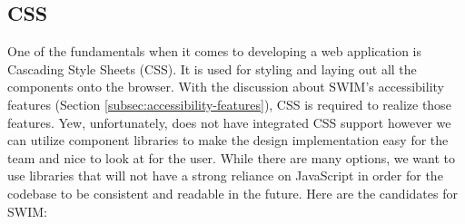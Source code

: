 \documentclass[
    paper=letter,
    parskip=half,
    fontsize=12pt,
    titlepage=firstiscover,
    toc=bibliography,
    numbers=endperiod
]{scrartcl}
\begin{document}
\subsection{CSS}

One of the fundamentals when it comes to developing a web application is
Cascading Style Sheets (CSS). It is used for styling and laying out all
the components onto the browser. With the discussion about SWIM's
accessibility features (Section \ref{subsec:accessibility-features}),
CSS is required to realize those features. Yew, unfortunately, does not
have integrated CSS support however we can utilize component libraries
to make the design implementation easy for the team and nice to look at
for the user. While there are many options, we want to use libraries
that will not have a strong reliance on JavaScript in order for the
codebase to be consistent and readable in the future. Here are the
candidates for SWIM:
\end{document}
